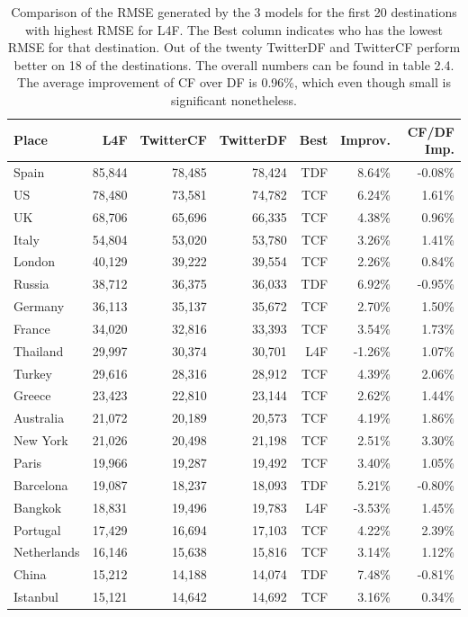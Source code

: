 \documentclass[minf,frontabs,twoside,singlespacing,parskip]{infthesis}
\begin{document}
\begin{table}[p]
\begin{center}
\begin{tabular}{ l | r | r | r | r | r | r }
Place & L4F &  TwitterCF & TwitterDF & Best & Improv. & CF/DF Imp. \\
\hline
Spain & 85,844 & 78,485 & 78,424 & TDF & 8.64\% & -0.08\%\\
US & 78,480 & 73,581 & 74,782 & TCF & 6.24\% & 1.61\%\\
UK & 68,706 & 65,696 & 66,335 & TCF & 4.38\% & 0.96\%\\
Italy & 54,804 & 53,020 & 53,780 & TCF & 3.26\% & 1.41\%\\
London & 40,129 & 39,222 & 39,554 & TCF & 2.26\% & 0.84\%\\
Russia & 38,712 & 36,375 & 36,033 & TDF & 6.92\% & -0.95\%\\
Germany & 36,113 & 35,137 & 35,672 & TCF & 2.70\% & 1.50\%\\
France & 34,020 & 32,816 & 33,393 & TCF & 3.54\% & 1.73\%\\
Thailand & 29,997 & 30,374 & 30,701 & L4F & -1.26\% & 1.07\%\\
Turkey & 29,616 & 28,316 & 28,912 & TCF & 4.39\% & 2.06\%\\
Greece & 23,423 & 22,810 & 23,144 & TCF & 2.62\% & 1.44\%\\
Australia & 21,072 & 20,189 & 20,573 & TCF & 4.19\% & 1.86\%\\
New York & 21,026 & 20,498 & 21,198 & TCF & 2.51\% & 3.30\%\\
Paris & 19,966 & 19,287 & 19,492 & TCF & 3.40\% & 1.05\%\\
Barcelona & 19,087 & 18,237 & 18,093 & TDF & 5.21\% & -0.80\%\\
Bangkok & 18,831 & 19,496 & 19,783 & L4F & -3.53\% & 1.45\%\\
Portugal & 17,429 & 16,694 & 17,103 & TCF & 4.22\% & 2.39\%\\
Netherlands & 16,146 & 15,638 & 15,816 & TCF & 3.14\% & 1.12\%\\
China & 15,212 & 14,188 & 14,074 & TDF & 7.48\% & -0.81\%\\
Istanbul & 15,121 & 14,642 & 14,692 & TCF & 3.16\% & 0.34\%
\end{tabular}
\end{center}
\caption{Comparison of the RMSE generated by the 3 models for the first 20 destinations with highest RMSE for L4F. The Best column indicates who has the lowest RMSE for that destination. Out of the twenty TwitterDF and TwitterCF perform better on 18 of the destinations. The overall numbers can be found in table 2.4. The average improvement of CF over DF is 0.96\%, which even though small is significant nonetheless. }
\end{table}
\end{document}
